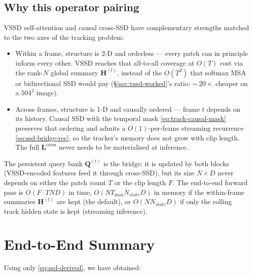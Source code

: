 \documentclass[11pt,a4paper]{article}
\begin{document}
\subsection{Why this operator pairing}
\label{sec:track-why}

VSSD self-attention and causal cross-SSD have complementary
strengths matched to the two axes of the tracking problem:
\begin{itemize}
  \item Within a frame, structure is 2-D and orderless — every patch
        can in principle inform every other. VSSD reaches that
        all-to-all coverage at $O(T)$ cost via the rank-$N$ global
        summary $\bm{H}^{(t)}$, instead of the $O(T^{2})$ that
        softmax MSA or bidirectional SSD would pay
        (\S\ref{sec:vssd-worked}'s ratio: $\sim$\,$20\!\times$
        cheaper on a $504^{2}$ image).
  \item Across frames, structure is 1-D and causally ordered — frame
        $t$ depends on its history. Causal SSD with the temporal
        mask \eqref{eq:track-causal-mask} preserves that ordering
        and admits a $O(1)$-per-frame streaming recurrence
        \eqref{eq:ssd-bridge-rec}, so the tracker's memory does not
        grow with clip length. The full $\bm{L}^{\text{cross}}$
        never needs to be materialised at inference.
\end{itemize}
The persistent query bank $\bm{Q}^{(t)}$ is the bridge: it is
updated by both blocks (VSSD-encoded features feed it through
cross-SSD), but its size $N\!\times\!D$ never depends on either the
patch count $T$ or the clip length $F$. The end-to-end forward pass
is $O(F \cdot T N D)$ in time, $O(N T_{\max} N_{\!state} D)$ in
memory if the within-frame summaries $\bm{H}^{(t)}$ are kept (the
default), or $O(N N_{\!state} D)$ if only the rolling track hidden
state is kept (streaming inference).

\section{End-to-End Summary}

Using only \eqref{eq:ssd-derived}, we have obtained:
\end{document}
